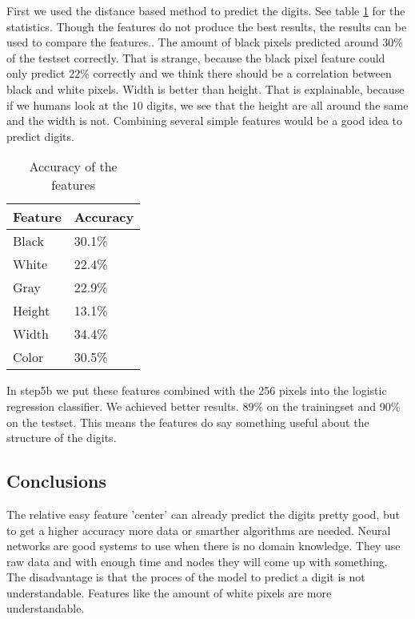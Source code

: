 \documentclass{article}
\begin{document}
First we used the distance based method to predict the digits. See table \ref{tab:accuracy} for the statistics. Though the features do not produce the best results, the results can be used to compare the features.. The amount of black pixels predicted around $30$\% of the testset correctly. That is strange, because the black pixel feature could only predict $22$\%  correctly and we think there should be a correlation between black and white pixels. Width is better than height. That is explainable, because if we humans look at the $10$ digits, we see that the height are all around the same and the width is not. Combining several simple features would be a good idea to predict digits. 

\begin{table}[H]
	\begin{center}
	\begin{tabular}{l|l}
		Feature & Accuracy \\
		\hline
		Black & 30.1\% \\
		White & 22.4\% \\
		Gray & 22.9\% \\
		Height & 13.1\% \\
		Width & 34.4\% \\
		Color & 30.5\% \\
	\end{tabular}
	\end{center}	
	\caption{Accuracy of the features}
	\label{tab:accuracy}
\end{table}

In step5b we put these features combined with the 256 pixels into the logistic regression classifier. We achieved better results. 89\% on the trainingset and 90\% on the testset. This means the features do say something useful about the structure of the digits.

\subsection{Conclusions}
The relative easy feature 'center' can already predict the digits pretty good, but to get a higher accuracy more data or smarther algorithms are needed. Neural networks are good systems to use when there is no domain knowledge. They use raw data and with enough time and nodes they will come up with something. The disadvantage is that the proces of the model to predict a digit is not understandable. Features like the amount of white pixels are more understandable.
\end{document}
